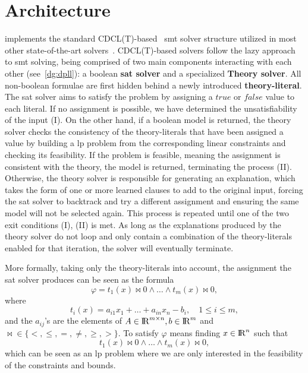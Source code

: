 \documentclass[runningheads]{llncs}
\begin{document}
\section{Architecture}
\label{sec:architecture}

\dlinear implements the standard CDCL(T)-based~\cite{ref:dpll-t} \gls{smt} solver structure utilized in most other state-of-the-art solvers~\cite{ref:cvc5}.
CDCL(T)-based solvers follow the lazy approach to \gls{smt} solving, being comprised of two main components interacting with each other (see~\autoref{dg:dpll}): a boolean \textbf{\gls{sat} solver} and a specialized \textbf{Theory solver}.
All non-boolean formulae are first hidden behind a newly introduced \textbf{theory-literal}.
The \gls{sat} solver aims to satisfy the problem by assigning a $true$ or $false$ value to each literal.
If no assignment is possible, we have determined the unsatisfiability of the input (I).
On the other hand, if a boolean model is returned, the theory solver checks the consistency of the theory-literals that have been assigned a value by building a \gls{lp} problem from the corresponding linear constraints and checking its feasibility.
If the problem is feasible, meaning the assignment is consistent with the theory, the model is returned, terminating the process (II).
Otherwise, the theory solver is responsible for generating an explanation, which takes the form of one or more learned clauses to add to the original input, forcing the \gls{sat} solver to backtrack and try a different assignment and ensuring the same model will not be selected again.
This process is repeated until one of the two exit conditions (I), (II) is met.
As long as the explanations produced by the theory solver do not loop and only contain a combination of the theory-literals enabled for that iteration, the solver will eventually terminate.


More formally, taking only the theory-literals into account, the assignment the \gls{sat} solver produces can be seen as the formula
\begin{equation} %
    \label{eq:smt-formula}
    \varphi = t_1(x) \bowtie 0 \wedge \ldots \wedge t_m (x) \bowtie 0,
\end{equation}
where
\begin{equation*}
    t_i(x) = a_{i1}x_1 + \ldots + a_{in}x_n - b_i, \quad 1 \le i \le m,
\end{equation*}
and the $a_{ij}$'s are the elements of $A \in {\rm I\!R}^{m \times n}, b \in {\rm I\!R}^m$ and $\bowtie \in \{<, \le, =, \ne, \ge, >\}$.
To satisfy $\varphi$ means finding $x \in {\rm I\!R}^n $ such that
\begin{equation*}
    t_1(x) \bowtie 0 \wedge \ldots \wedge t_m(x) \bowtie 0,
\end{equation*}
which can be seen as an \gls{lp} problem where we are only interested in the feasibility of the constraints and bounds.
\end{document}

